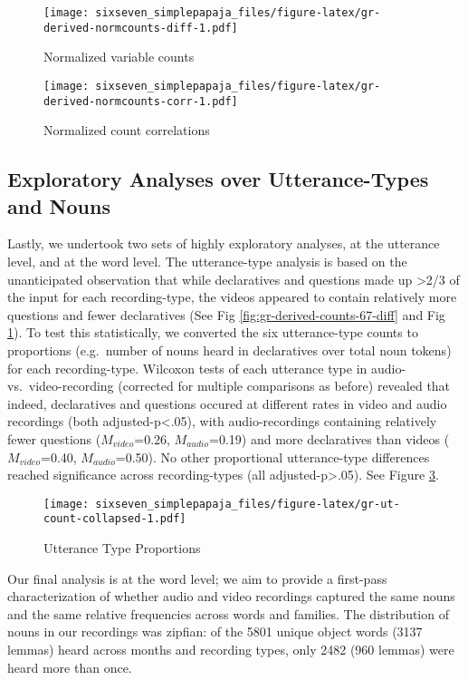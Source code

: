 \documentclass[floatsintext,man]{apa6}
\theoremstyle{definition}
\theoremstyle{definition}
\theoremstyle{definition}
\theoremstyle{remark}
\begin{document}
\begin{figure}
\centering
\texttt{[image: sixseven\_simplepapaja\_files/figure-latex/gr-derived-normcounts-diff-1.pdf]}
\caption{\label{fig:gr-derived-normcounts-diff}Normalized variable counts}
\end{figure}

\begin{figure}
\centering
\texttt{[image: sixseven\_simplepapaja\_files/figure-latex/gr-derived-normcounts-corr-1.pdf]}
\caption{\label{fig:gr-derived-normcounts-corr}Normalized count
correlations}
\end{figure}

\subsection{Exploratory Analyses over Utterance-Types and
Nouns}\label{exploratory-analyses-over-utterance-types-and-nouns}

Lastly, we undertook two sets of highly exploratory analyses, at the
utterance level, and at the word level. The utterance-type analysis is
based on the unanticipated observation that while declaratives and
questions made up \textgreater{}2/3 of the input for each
recording-type, the videos appeared to contain relatively more questions
and fewer declaratives (See Fig \ref{fig:gr-derived-counts-67-diff} and
Fig \ref{fig:gr-derived-normcounts-diff}). To test this statistically,
we converted the six utterance-type counts to proportions (e.g.~number
of nouns heard in declaratives over total noun tokens) for each
recording-type. Wilcoxon tests of each utterance type in audio-
vs.~video-recording (corrected for multiple comparisons as before)
revealed that indeed, declaratives and questions occured at different
rates in video and audio recordings (both adjusted-p\textless{}.05),
with audio-recordings containing relatively fewer questions
(\(M_{video}\)=0.26, \(M_{audio}\)=0.19) and more declaratives than
videos (\(M_{video}\)=0.40, \(M_{audio}\)=0.50). No other proportional
utterance-type differences reached significance across recording-types
(all adjusted-p\textgreater{}.05). See Figure
\ref{fig:gr-ut-count-collapsed}.

\begin{figure}
\centering
\texttt{[image: sixseven\_simplepapaja\_files/figure-latex/gr-ut-count-collapsed-1.pdf]}
\caption{\label{fig:gr-ut-count-collapsed}Utterance Type Proportions}
\end{figure}

Our final analysis is at the word level; we aim to provide a first-pass
characterization of whether audio and video recordings captured the same
nouns and the same relative frequencies across words and families. The
distribution of nouns in our recordings was zipfian: of the 5801 unique
object words (3137 lemmas) heard across months and recording types, only
2482 (960 lemmas) were heard more than once.
\end{document}
